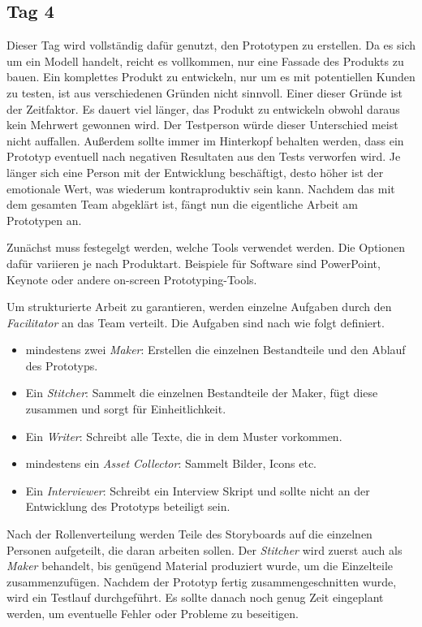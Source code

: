 \subsection*{\label{sec:Sprint-Tag4}\thesubsection\quad Tag 4}
Dieser Tag wird vollständig dafür genutzt, den Prototypen zu erstellen. Da es sich um ein Modell handelt, reicht es vollkommen, nur eine Fassade des Produkts zu bauen. Ein komplettes Produkt zu entwickeln, nur um es mit potentiellen Kunden zu testen, ist aus verschiedenen Gründen nicht sinnvoll. Einer dieser Gründe ist der Zeitfaktor. Es dauert viel länger, das Produkt zu entwickeln obwohl daraus kein Mehrwert gewonnen wird. Der Testperson würde dieser Unterschied meist nicht auffallen. Außerdem sollte immer im Hinterkopf behalten werden, dass ein Prototyp eventuell nach negativen Resultaten aus den Tests verworfen wird. Je länger sich eine Person mit der Entwicklung beschäftigt, desto höher ist der emotionale Wert, was wiederum kontraproduktiv sein kann. Nachdem das mit dem gesamten Team abgeklärt ist, fängt nun die eigentliche Arbeit am Prototypen an.

Zunächst muss festegelgt werden, welche Tools verwendet werden. Die Optionen dafür variieren je nach Produktart. Beispiele für Software sind PowerPoint, Keynote oder andere on-screen Prototyping-Tools.

Um strukturierte Arbeit zu garantieren, werden einzelne Aufgaben durch den \textit{Facilitator} an das Team verteilt. Die Aufgaben sind nach \citeauthor{Sprint} wie folgt definiert.
\begin{itemize}
	\item mindestens zwei \textit{Maker}:
	Erstellen die einzelnen Bestandteile und den Ablauf des Prototyps.
	\item Ein \textit{Stitcher}:
	Sammelt die einzelnen Bestandteile der Maker, fügt diese zusammen und sorgt für Einheitlichkeit.
	\item Ein \textit{Writer}:
	Schreibt alle Texte, die in dem Muster vorkommen.
	\item mindestens ein \textit{Asset Collector}:
	Sammelt Bilder, Icons etc.
	\item Ein \textit{Interviewer}:
	Schreibt ein Interview Skript und sollte nicht an der Entwicklung des Prototyps beteiligt sein.
\end{itemize}

Nach der Rollenverteilung werden Teile des Storyboards auf die einzelnen Personen aufgeteilt, die daran arbeiten sollen. Der \textit{Stitcher} wird zuerst auch als \textit{Maker} behandelt, bis genügend Material produziert wurde, um die Einzelteile zusammenzufügen. Nachdem der Prototyp fertig zusammengeschnitten wurde, wird ein Testlauf durchgeführt. Es sollte danach noch genug Zeit eingeplant werden, um eventuelle Fehler oder Probleme zu beseitigen.


